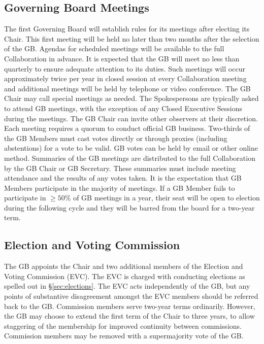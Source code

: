 \documentclass[12pt]{article}
\begin{document}
\subsection{Governing Board Meetings}
The first Governing Board will establish rules for its meetings after electing its Chair. This first meeting will be held no later than two months after the selection of the GB.  Agendas for scheduled meetings will be available to the full Collaboration in advance.  It is expected that the GB will meet no less than quarterly to ensure adequate attention to its duties. \textcolor{\markcolor}{Such meetings will occur approximately twice per year in closed session at every Collaboration meeting and additional meetings will be held by telephone or video conference. 
 The GB Chair may call special meetings as needed.} The Spokespersons are typically asked to attend GB meetings, with the exception of any Closed Executive Sessions during the meetings.  The GB Chair can invite other observers at their discretion. Each meeting requires a quorum to conduct official GB business. Two-thirds of the GB Members must cast votes directly or through proxies (including abstentions) for a vote to be valid.  
GB votes can be held by email or other online method. Summaries of the GB meetings are distributed to the full Collaboration by the GB Chair or GB Secretary. These summaries must include meeting attendance and the %
results of any votes taken.
 It is the expectation that GB Members participate in the majority of meetings. If a GB Member fails to participate %
 in $\ge 50\%$ of GB meetings in a year, their seat will be open to election during the following cycle and they will be barred from the board for a two-year term.  

\subsection{Election and Voting Commission}
The GB appoints the Chair and two additional members of the Election and Voting Commission (EVC).  The EVC is charged with conducting elections as spelled out in \S\ref{sec:elections}. The EVC acts independently of the GB, but any points of substantive disagreement amongst the EVC members should be referred back to the GB.  Commission members serve two-year terms ordinarily.  However, the GB may choose to extend the first term of the Chair to  three years, to allow staggering of the membership for improved continuity between commissions.   Commission members may be removed with a supermajority vote of the GB.
 
\end{document}
